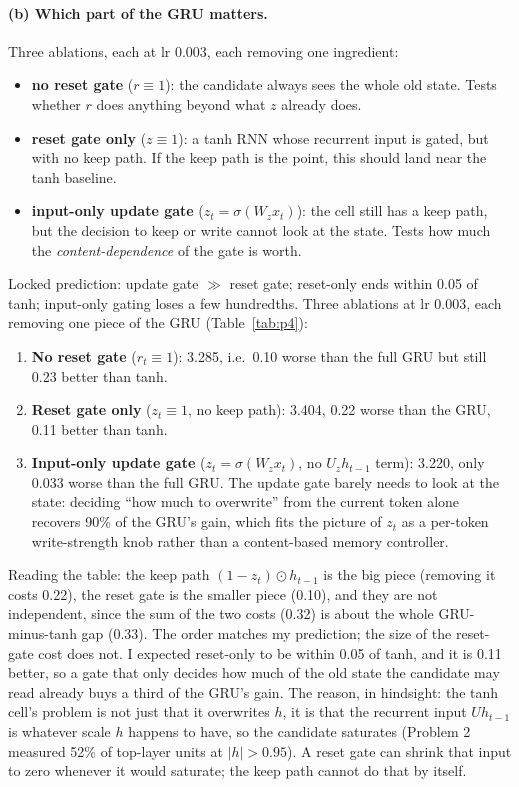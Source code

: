 \paragraph{(b) Which part of the GRU matters.} Three ablations, each at lr 0.003, each removing one ingredient:
\begin{itemize}\setlength\itemsep{0pt}
\item \textbf{no reset gate} ($r\equiv 1$): the candidate always sees the whole old state. Tests whether $r$ does anything beyond what $z$ already does.
\item \textbf{reset gate only} ($z\equiv 1$): a tanh RNN whose recurrent input is gated, but with no keep path. If the keep path is the point, this should land near the tanh baseline.
\item \textbf{input-only update gate} ($z_t=\sigma(W_z x_t)$): the cell still has a keep path, but the decision to keep or write cannot look at the state. Tests how much the \emph{content-dependence} of the gate is worth.
\end{itemize}
Locked prediction: update gate $\gg$ reset gate; reset-only ends within 0.05 of tanh; input-only gating loses a few hundredths.
Three ablations at lr 0.003, each removing one piece of the GRU (Table~\ref{tab:p4}):

\begin{enumerate}[nosep]
\item \textbf{No reset gate} ($r_t\equiv 1$): 3.285, i.e.\ 0.10 worse than the full GRU but still 0.23 better than tanh.
\item \textbf{Reset gate only} ($z_t\equiv 1$, no keep path): 3.404, 0.22 worse than the GRU, 0.11 better than tanh.
\item \textbf{Input-only update gate} ($z_t=\sigma(W_z x_t)$, no $U_z h_{t-1}$ term): 3.220, only 0.033 worse than the full GRU. The update gate barely needs to look at the state: deciding ``how much to overwrite'' from the current token alone recovers 90\% of the GRU's gain, which fits the picture of $z_t$ as a per-token write-strength knob rather than a content-based memory controller.
\end{enumerate}

Reading the table: the keep path $(1-z_t)\odot h_{t-1}$ is the big piece (removing it costs 0.22), the reset gate is the smaller piece (0.10), and they are not independent, since the sum of the two costs (0.32) is about the whole GRU-minus-tanh gap (0.33). The order matches my prediction; the size of the reset-gate cost does not. I expected reset-only to be within 0.05 of tanh, and it is 0.11 better, so a gate that only decides how much of the old state the candidate may read already buys a third of the GRU's gain. The reason, in hindsight: the tanh cell's problem is not just that it overwrites $h$, it is that the recurrent input $Uh_{t-1}$ is whatever scale $h$ happens to have, so the candidate saturates (Problem 2 measured 52\% of top-layer units at $|h|>0.95$). A reset gate can shrink that input to zero whenever it would saturate; the keep path cannot do that by itself.


